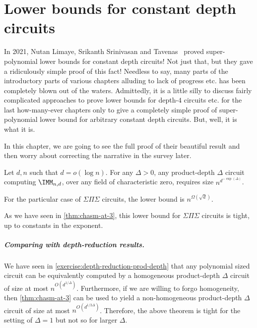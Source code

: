\chapter{Lower bounds for constant depth circuits}

In 2021, Nutan Limaye, Srikanth Srinivasan and \Sebastien Tavenas~\cite{LST21} proved super-polynomial lower bounds for constant depth circuits! Not just that, but they gave a ridiculously simple proof of this fact! Needless to say, many parts of the introductory parts of various chapters alluding to lack of progress etc. has been completely blown out of the waters. Admittedly, it is a little silly to discuss fairly complicated approaches to prove lower bounds for depth-$4$ circuits etc. for the last how-many-ever chapters only to give a completely simple proof of super-polynomial lower bound for arbitrary constant depth circuits. But, well, it is what it is. 

In this chapter, we are going to see the full proof of their beautiful result and then worry about correcting the narrative in the survey later. 

\begin{theorem} Let $d,n$ such that $d = o(\log n)$. For any $\Delta > 0$, any product-depth $\Delta$ circuit computing $\IMM_{n,d}$, over any field of characteristic zero, requires size $n^{d^{-\exp(\Delta)}}$.

  For the particular case of $\Sigma\Pi\Sigma$ circuits, the lower bound is $n^{\Omega(\sqrt{d})}$. 
\end{theorem}

As we have seen in \autoref{thm:chasm-at-3}, this lower bound for $\Sigma\Pi\Sigma$ circuits is tight, up to constants in the exponent.

\paragraph{Comparing with depth-reduction results.} We have seen in \autoref{exercise:depth-reduction-prod-depth} that any polynomial sized circuit can be equivalently computed by a homogeneous product-depth $\Delta$ circuit of size at most $n^{O(d^{1/\Delta})}$. Furthermore, if we are willing to forgo homogeneity, then \autoref{thm:chasm-at-3} can be used to yield a non-homogeneous product-depth $\Delta$ circuit of size at most $n^{O(d^{1/2\Delta})}$. Therefore, the above theorem is tight for the setting of $\Delta = 1$ but not so for larger $\Delta$.

